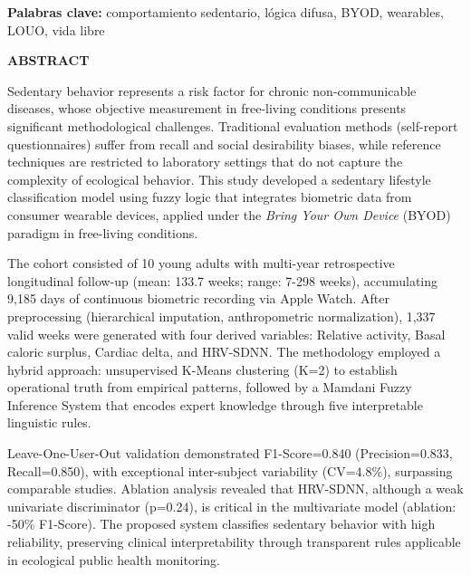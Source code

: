 \documentclass[12pt,letterpaper,oneside]{report}
\begin{document}
\vspace{0.5cm}
\noindent\textbf{Palabras clave:} comportamiento sedentario, lógica difusa, BYOD, wearables, LOUO, vida libre

\newpage
\thispagestyle{empty}

{\centering
{\fontsize{14}{16}\selectfont\bfseries ABSTRACT}\\[1cm]
}

\setlength{\parindent}{1.27cm}
\onehalfspacing
\setlength{\parskip}{6pt plus 2pt minus 1pt}

Sedentary behavior represents a risk factor for chronic non-communicable diseases, whose objective measurement in free-living conditions presents significant methodological challenges. Traditional evaluation methods (self-report questionnaires) suffer from recall and social desirability biases, while reference techniques are restricted to laboratory settings that do not capture the complexity of ecological behavior. This study developed a sedentary lifestyle classification model using fuzzy logic that integrates biometric data from consumer wearable devices, applied under the \textit{Bring Your Own Device} (BYOD) paradigm in free-living conditions.

The cohort consisted of 10 young adults with multi-year retrospective longitudinal follow-up (mean: 133.7 weeks; range: 7-298 weeks), accumulating 9,185 days of continuous biometric recording via Apple Watch. After preprocessing (hierarchical imputation, anthropometric normalization), 1,337 valid weeks were generated with four derived variables: Relative activity, Basal caloric surplus, Cardiac delta, and HRV-SDNN. The methodology employed a hybrid approach: unsupervised K-Means clustering (K=2) to establish operational truth from empirical patterns, followed by a Mamdani Fuzzy Inference System that encodes expert knowledge through five interpretable linguistic rules.

Leave-One-User-Out validation demonstrated F1-Score=0.840 (Precision=0.833, Recall=0.850), with exceptional inter-subject variability (CV=4.8\%), surpassing comparable studies. Ablation analysis revealed that HRV-SDNN, although a weak univariate discriminator (p=0.24), is critical in the multivariate model (ablation: -50\% F1-Score). The proposed system classifies sedentary behavior with high reliability, preserving clinical interpretability through transparent rules applicable in ecological public health monitoring.
\end{document}
